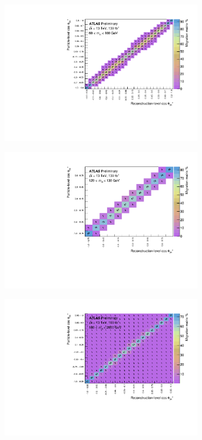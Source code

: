 \begin{figure}[htb]
  \centering
  \begin{subfigure}{.49\textwidth}\centering\includegraphics[width = 0.95\textwidth]{Figures/m4l/UnfoldingStudies/v014_matrices/cosThetaStar3_m4l60-100Matrix.pdf}\end{subfigure}
  \begin{subfigure}{.49\textwidth}\centering\includegraphics[width = 0.95\textwidth]{Figures/m4l/UnfoldingStudies/v014_matrices/cosThetaStar3_m4l120-130Matrix.pdf}\end{subfigure}
  \begin{subfigure}{.49\textwidth}\centering\includegraphics[width = 0.95\textwidth]{Figures/m4l/UnfoldingStudies/v014_matrices/cosThetaStar3_m4l180-2000Matrix.pdf}\end{subfigure}

\end{figure}
